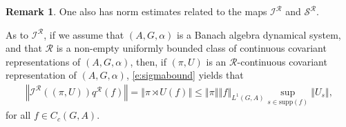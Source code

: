 \documentclass{amsart}
\theoremstyle{plain}
\theoremstyle{definition}
\newtheorem{remark}[theorem]{Remark}
\numberwithin{equation}{section}
\begin{document}
\begin{remark}\label{r:constantdefinitions_estimates}
One also has norm estimates related to the maps ${{\mathcal I}^{\mathcal R}}$ and ${{\mathcal S}^{\mathcal R}}$.

As to ${{\mathcal I}^{\mathcal R}}$, if we assume that ${(A,G,\alpha)}$ is a Banach algebra dynamical system, and that ${\mathcal R}$ is a non-empty uniformly bounded class of continuous covariant representations of ${(A,G,\alpha)}$, then, if  ${(\pi,U)}$ is an ${\mathcal R}$-continuous covariant representation of ${(A,G,\alpha)}$, \eqref{e:sigmabound} yields that
\begin{align}\label{e:i_estimate}
{\left\Vert {{{\mathcal I}^{\mathcal R}}({(\pi,U)}){q^{\mathcal R}}(f)} \right\Vert}= {\left\Vert {{\pi \rtimes U}(f)} \right\Vert} \leq {\left\Vert {\pi} \right\Vert} {\left\Vert {f} \right\Vert}_{L^1(G,A)} \sup_{s \in {\text{supp}}(f)} {\left\Vert {U_s} \right\Vert},
\end{align}
for all $f \in C_c(G,A)$.


\end{remark}
\end{document}
